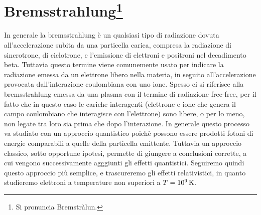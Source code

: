 \section[Bremsstrahlung]{Bremsstrahlung\footnote{Si pronuncia Bremstràlun.}}
In generale la bremsstrahlung è un qualsiasi tipo di radiazione dovuta all'accelerazione subita da una particella carica, compresa la radiazione di sincrotrone, di ciclotrone, e l'emissione di elettroni e positroni nel decadimento beta. Tuttavia questo termine viene comunemente usato per indicare la radiazione emessa da un elettrone libero nella materia, in seguito all'accelerazione provocata dall'interazione coulombiana con uno ione. Spesso ci si riferisce alla bremsstrahlung emessa da una plasma con il termine di radiazione free-free, per il fatto che in questo caso le cariche interagenti (elettrone e ione che genera il campo coulombiano che interagisce con l'elettrone) sono libere, o per lo meno, non legate tra loro sia prima che dopo l'interazione.
In generale questo processo va studiato con un approccio quantistico poichè possono essere prodotti fotoni di energie comparabili a quelle della particella emittente. Tuttavia un approccio classico, sotto opportune ipotesi, permette di giungere a conclusioni corrette, a cui vengono successivamente agggiunti gli effetti quantistici. Seguiremo quindi questo approccio più semplice, e trascureremo gli effetti relativistici, in quanto studieremo elettroni a temperature non superiori a $T=10^9\,\mathrm{ K}$. 

